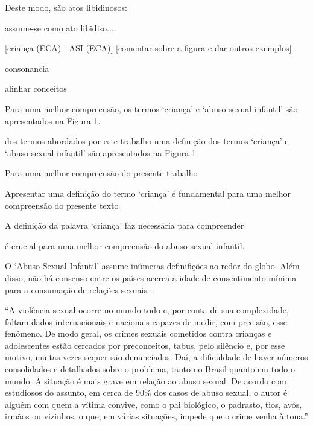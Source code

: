 Deste modo, são atos libidinosos: 







assume-se como ato libidiso....








[criança (ECA) | ASI (ECA)]
[comentar sobre a figura e dar outros exemplos]

consonancia 

alinhar conceitos


Para uma melhor compreensão, os termos `criança' e `abuso sexual infantil' são apresentados na Figura 1. 




dos termos abordados por este trabalho uma definição dos termos `criança' e `abuso sexual infantil' são apresentados na Figura 1. 




Para uma melhor compreensão do presente trabalho


Apresentar uma definição do termo `criança' é fundamental para uma melhor compreensão do presente texto


A definição da palavra `criança' faz necessária para compreender


é crucial para uma melhor compreensão do abuso sexual infantil.






O `Abuso Sexual Infantil' assume inúmeras definifições ao redor do globo. Além disso, não há consenso entre os países acerca a idade de consentimento mínima para a consumação de relações sexuais \cite{bullough2005age}. 




``A violência sexual ocorre no mundo todo e, por conta de sua complexidade, faltam dados internacionais e nacionais capazes de medir, com precisão,
esse fenômeno. De modo geral, os crimes sexuais cometidos contra crianças
e adolescentes estão cercados por preconceitos, tabus, pelo silêncio e, por
esse motivo, muitas vezes sequer são denunciados. Daí, a dificuldade de haver
números consolidados e detalhados sobre o problema, tanto no Brasil quanto
em todo o mundo. A situação é mais grave em relação ao abuso sexual. De
acordo com estudiosos do assunto, em cerca de 90\% dos casos de abuso
sexual, o autor é alguém com quem a vítima convive, como o pai biológico,
o padrasto, tios, avós, irmãos ou vizinhos, o que, em várias situações, impede
que o crime venha à tona.'' %

